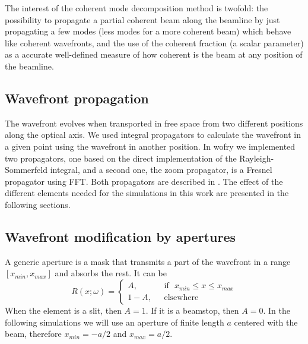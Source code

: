 \documentclass{iucr}              %
\begin{document}
The interest of the coherent mode decomposition method is twofold: the possibility to propagate a partial coherent beam along the beamline by just propagating a few modes (less modes for a more coherent beam) which behave like coherent wavefronts, and the use of the coherent fraction (a scalar parameter) as a accurate well-defined measure of how coherent is the beam at any position of the beamline.

\subsection{Wavefront propagation}


The wavefront evolves when transported in free space from two different positions along the optical axis. We used integral propagators to calculate the wavefront in a given point using the wavefront in another position. In wofry we implemented two propagators, one based on the direct implementation of the  Rayleigh-Sommerfeld integral, and a second one, the zoom propagator, is a Fresnel propagator using FFT. Both propagators are described in \cite{srioLBL}. The effect of the different elements needed for the simulations in this work are presented in the following sections. 


\subsection{Wavefront modification by apertures}

A generic aperture is a mask that transmits a part of the wavefront in a range $[x_{min},x_{max}]$ and absorbs the rest. It can be
\begin{equation}
R(x;\omega) =
\left\{
\begin{matrix}
A,  & \mbox{~~if~~} x_{min} \le x \le x_{max}
\\ 
1 - A, & \mbox{~~elsewhere}
\end{matrix}
\right.
\end{equation}
When the element is a slit, then $A=1$. If it is a beamstop, then $A=0$. In the following simulations we will use an aperture of finite length $a$ centered with the beam, therefore $x_{min}=-a/2$ and $x_{max}=a/2$.
\end{document}
